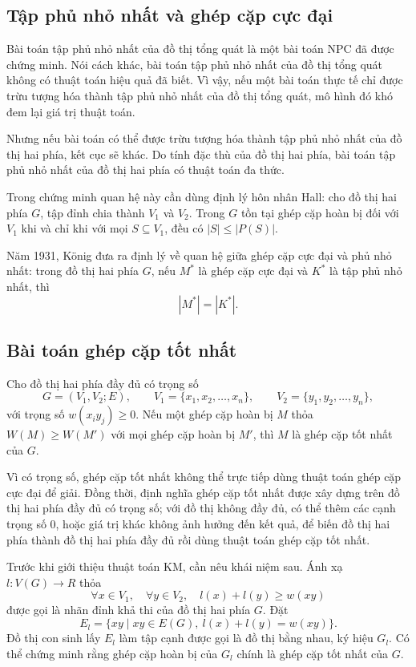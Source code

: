 \documentclass[11pt]{article}
\begin{document}
\subsection*{Tập phủ nhỏ nhất và ghép cặp cực đại}

Bài toán tập phủ nhỏ nhất của đồ thị tổng quát là một bài toán NPC đã được
chứng minh. Nói cách khác, bài toán tập phủ nhỏ nhất của đồ thị tổng quát
không có thuật toán hiệu quả đã biết. Vì vậy, nếu một bài toán thực tế chỉ
được trừu tượng hóa thành tập phủ nhỏ nhất của đồ thị tổng quát, mô hình đó
khó đem lại giá trị thuật toán.

Nhưng nếu bài toán có thể được trừu tượng hóa thành tập phủ nhỏ nhất của đồ
thị hai phía, kết cục sẽ khác. Do tính đặc thù của đồ thị hai phía, bài toán
tập phủ nhỏ nhất của đồ thị hai phía có thuật toán đa thức.

Trong chứng minh quan hệ này cần dùng định lý hôn nhân Hall: cho đồ thị hai
phía \(G\), tập đỉnh chia thành \(V_1\) và \(V_2\). Trong \(G\) tồn tại ghép
cặp hoàn bị đối với \(V_1\) khi và chỉ khi với mọi \(S\subseteq V_1\), đều
có \(|S|\le |P(S)|\).

Năm 1931, König đưa ra định lý về quan hệ giữa ghép cặp cực đại và phủ nhỏ
nhất: trong đồ thị hai phía \(G\), nếu \(M^*\) là ghép cặp cực đại và \(K^*\)
là tập phủ nhỏ nhất, thì
\[
  |M^*|=|K^*|.
\]

\subsection*{Bài toán ghép cặp tốt nhất}

Cho đồ thị hai phía đầy đủ có trọng số
\[
G=(V_1,V_2;E),\qquad
V_1=\{x_1,x_2,\ldots,x_n\},\qquad
V_2=\{y_1,y_2,\ldots,y_n\},
\]
với trọng số \(w(x_iy_j)\ge 0\). Nếu một ghép cặp hoàn bị \(M\) thỏa
\(W(M)\ge W(M')\) với mọi ghép cặp hoàn bị \(M'\), thì \(M\) là ghép cặp tốt
nhất của \(G\).

Vì có trọng số, ghép cặp tốt nhất không thể trực tiếp dùng thuật toán ghép
cặp cực đại để giải. Đồng thời, định nghĩa ghép cặp tốt nhất được xây dựng
trên đồ thị hai phía đầy đủ có trọng số; với đồ thị không đầy đủ, có thể
thêm các cạnh trọng số \(0\), hoặc giá trị khác không ảnh hưởng đến kết quả,
để biến đồ thị hai phía thành đồ thị hai phía đầy đủ rồi dùng thuật toán
ghép cặp tốt nhất.

Trước khi giới thiệu thuật toán KM, cần nêu khái niệm sau. Ánh xạ
\(l:V(G)\to R\) thỏa
\[
  \forall x\in V_1,\quad \forall y\in V_2,\quad
  l(x)+l(y)\ge w(xy)
\]
được gọi là nhãn đỉnh khả thi của đồ thị hai phía \(G\). Đặt
\[
  E_l=\{xy\mid xy\in E(G),\ l(x)+l(y)=w(xy)\}.
\]
Đồ thị con sinh lấy \(E_l\) làm tập cạnh được gọi là đồ thị bằng nhau, ký
hiệu \(G_l\). Có thể chứng minh rằng ghép cặp hoàn bị của \(G_l\) chính là
ghép cặp tốt nhất của \(G\).
\end{document}
